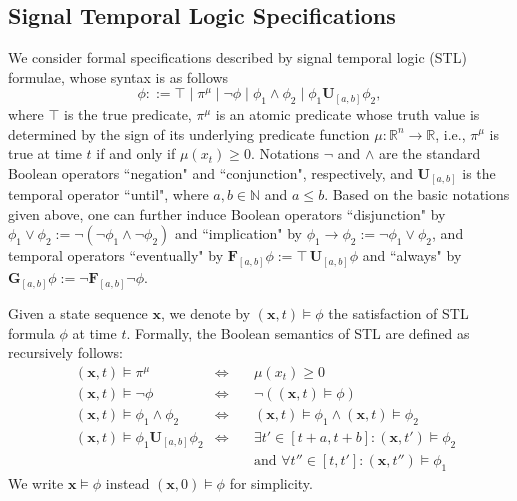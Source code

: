 \documentclass[letterpaper, 10 pt, conference]{ieeeconf}
\begin{document}
\subsection{Signal Temporal Logic Specifications}
We consider formal specifications described by signal temporal logic (STL) formulae, whose syntax  is  as follows
\[
\phi::= \top \mid \pi^\mu\mid \lnot\phi \mid  \phi_1\land \phi_2\mid \phi_1 \mathbf{U}_{[a,b]} \phi_2,
\]
where 
$\top$ is the true predicate, 
$\pi^\mu$ is an atomic predicate whose truth value is determined by the sign of its underlying predicate function $\mu: \mathbb{R}^n\to \mathbb{R}$, i.e., $\pi^\mu$ is true at time $t$ if and only if  $\mu(x_t)\geq 0$. Notations $\neg$ and $\land$ are the standard Boolean operators ``negation" and ``conjunction", respectively, and 
$\mathbf{U}_{[a,b]}$ is the temporal operator ``until", where $a,b\in \mathbb{N}$ and $a\leq b$.
Based on the basic notations given above, one can further induce Boolean operators ``disjunction" by $\phi_1\vee\phi_2:=\neg(\neg\phi_1\land\neg\phi_2)$ and ``implication" by $\phi_1\to\phi_2:=\neg\phi_1\vee\phi_2$, and temporal operators ``eventually" by $\mathbf{F}_{[a,b]}\phi:= \top \, \mathbf{U}_{[a,b]} \phi$ and ``always" by $\mathbf{G}_{[a,b]}\phi:=\lnot\mathbf{F}_{[a,b]}\lnot\phi$.

Given a state sequence $\mathbf{x}$, 
we denote by $(\mathbf{x},t)\models \phi$ the satisfaction of STL formula $\phi$ at time $t$. Formally, the Boolean semantics of STL  are  defined as recursively follows:
\begin{align}
    & (\mathbf{x},t)\models \pi^\mu &\Leftrightarrow \quad &\mu(x_t)\geq 0 \nonumber \\
    & (\mathbf{x},t)\models\neg \phi &\Leftrightarrow \quad &\neg((\mathbf{x},t)\models \phi) \nonumber \\
    & (\mathbf{x},t)\models \phi_1\land \phi_2 &\Leftrightarrow \quad & (\mathbf{x},t)\models \phi_1 \land (\mathbf{x},t)\models \phi_2 \nonumber \\
    & (\mathbf{x},t)\models \phi_1 \mathbf{U}_{[a,b]} \phi_2 &\Leftrightarrow \quad & \exists t'\in [t+a,t+b]\!:\! (\mathbf{x},t')\models \phi_2 \nonumber \\
    &&&\text{and } \forall t''\in [t,t']: (\mathbf{x},t'')\models \phi_1 \nonumber
\end{align}
We write $\mathbf{x}\models \phi$ instead $(\mathbf{x},0)\models \phi$ for simplicity.
\end{document}
